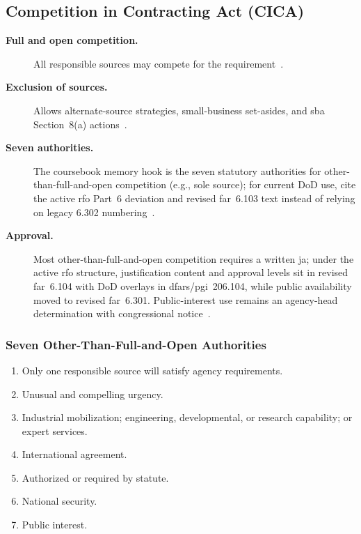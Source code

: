\documentclass[../main.tex]{subfiles}
\begin{document}
\subsection{Competition in Contracting Act (CICA)}
\begin{description}
  \item[\textbf{Full and open competition.}] All responsible sources may compete for the requirement~\autocite{edo-3-2-1-intro-contracting-2025}.
  \item[\textbf{Exclusion of sources.}] Allows alternate-source strategies, small-business set-asides, and \ac{sba} Section~8(a) actions~\autocite{edo-3-2-1-intro-contracting-2025}.
  \item[\textbf{Seven authorities.}] The coursebook memory hook is the seven statutory authorities for other-than-full-and-open competition (e.g., sole source); for current DoD use, cite the active \ac{rfo} Part~6 deviation and revised \ac{far}~6.103 text instead of relying on legacy 6.302 numbering~\autocite{edo-3-2-1-intro-contracting-2025,FAR-Overhaul-Part6-2026,DoD-RFO-Deviation-Part6-2026}.
  \item[\textbf{Approval.}] Most other-than-full-and-open competition requires a written \ac{ja}; under the active \ac{rfo} structure, justification content and approval levels sit in revised \ac{far}~6.104 with DoD overlays in \ac{dfars}/\ac{pgi}~206.104, while public availability moved to revised \ac{far}~6.301. Public-interest use remains an agency-head determination with congressional notice~\autocite{edo-3-2-1-intro-contracting-2025,FAR-Overhaul-Part6-2026,DoD-RFO-Deviation-Part6-2026}.
\end{description}

\subsubsection{Seven Other-Than-Full-and-Open Authorities}
\begin{enumerate}
  \item Only one responsible source will satisfy agency requirements.
  \item Unusual and compelling urgency.
  \item Industrial mobilization; engineering, developmental, or research capability; or expert services.
  \item International agreement.
  \item Authorized or required by statute.
  \item National security.
  \item Public interest.
\end{enumerate}
\end{document}
